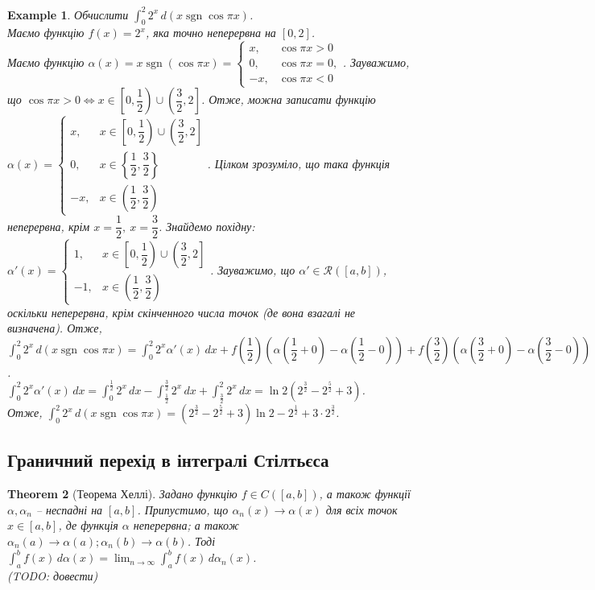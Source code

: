 \documentclass[a4paper, 10pt]{article}
\DeclareMathOperator\sign{sgn}
\theoremstyle{theoremdd}
\newtheorem{theorem}{Theorem}[subsection]
\theoremstyle{theoremdd}
\theoremstyle{theoremdd}
\theoremstyle{theoremdd}
\theoremstyle{theoremdd}
\newtheorem{example}[theorem]{Example}
\theoremstyle{theoremdd}
\theoremstyle{theoremdd}
\theoremstyle{theoremdd}
\theoremstyle{theoremdd}
\begin{document}
\begin{example}
Обчислити $\displaystyle\int_0^2 2^x\,d(x \sign \cos \pi x)$.\\
Маємо функцію $f(x) = 2^x$, яка точно неперервна на $[0,2]$. \\
Маємо функцію $\alpha(x) = x \sign (\cos \pi x) = \begin{cases} x, & \cos \pi x > 0 \\ 0, & \cos \pi x = 0, \\ -x, & \cos \pi x < 0 \end{cases}$. Зауважимо, що $\cos \pi x > 0 \iff x \in \left[0,\dfrac{1}{2}\right) \cup \left(\dfrac{3}{2},2\right]$. Отже, можна записати функцію $\alpha(x) = \begin{cases} x, & x \in \left[0,\dfrac{1}{2}\right) \cup \left(\dfrac{3}{2},2\right] \\ 0, & x \in \left\{\dfrac{1}{2},\dfrac{3}{2}\right\} \\ -x, & x \in \left(\dfrac{1}{2},\dfrac{3}{2}\right) \end{cases}$. Цілком зрозуміло, що така функція неперервна, крім $x = \dfrac{1}{2},\ x = \dfrac{3}{2}$. Знайдемо похідну:\\
$\alpha'(x) = \begin{cases} 1, & x \in \left[0,\dfrac{1}{2}\right) \cup \left(\dfrac{3}{2},2\right] \\ -1, & x \in \left(\dfrac{1}{2},\dfrac{3}{2}\right) \end{cases}$. Зауважимо, що $\alpha' \in \mathcal{R}([a,b])$, оскільки неперервна, крім скінченного числа точок (де вона взагалі не визначена). Отже,\\
$\displaystyle\int_0^2 2^x \,d(x \sign \cos \pi x) = \int_0^2 2^x \alpha'(x)\,dx + f\left(\dfrac{1}{2}\right) \left( \alpha\left(\dfrac{1}{2}+0\right) - \alpha\left(\dfrac{1}{2}-0\right) \right) + f\left(\dfrac{3}{2}\right) \left( \alpha\left(\dfrac{3}{2}+0\right) - \alpha\left(\dfrac{3}{2}-0\right) \right)$.\\
$\displaystyle\int_0^2 2^x \alpha'(x)\,dx = \int_0^{\frac{1}{2}}2^x\,dx - \int_{\frac{1}{2}}^{\frac{3}{2}}2^x\,dx + \int_{\frac{3}{2}}^2 2^x\,dx = \ln 2 (2^{\frac{3}{2}} - 2^{\frac{5}{2}} + 3)$.\\
Отже, $\displaystyle\int_0^2 2^x\,d(x \sign \cos \pi x) = (2^{\frac{3}{2}} - 2^{\frac{5}{2}} + 3) \ln 2 - 2^{\frac{1}{2}} + 3 \cdot 2^{\frac{3}{2}}$.
\end{example}

\subsection{Граничний перехід в інтегралі Стілтьєса}
\begin{theorem}[Теорема Хеллі]
Задано функцію $f \in C([a,b])$, а також функції $\alpha, \alpha_n$ -- неспадні на $[a,b]$. Припустимо, що $\alpha_n(x) \to \alpha(x)$ для всіх точок $x \in [a,b]$, де функція $\alpha$ неперервна; а також $\alpha_n(a) \to \alpha(a); \alpha_n(b) \to \alpha(b)$. Тоді $\displaystyle\int_a^b f(x)\,d\alpha(x) = \lim_{n \to \infty} \int_a^b f(x)\,d\alpha_n(x)$.\\
(TODO: довести)
\end{theorem}
\fi
\end{document}
